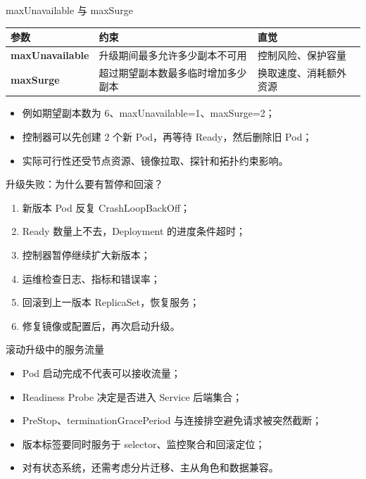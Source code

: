 \documentclass[UTF8,fontset=none,aspectratio=169,10pt]{beamer}
\begin{document}
\begin{frame}{maxUnavailable 与 maxSurge}
\begin{tabularx}{\linewidth}{>{\bfseries}p{3.1cm}XX}
\toprule
参数 & 约束 & 直觉 \\
\midrule
maxUnavailable & 升级期间最多允许多少副本不可用 & 控制风险、保护容量 \\
maxSurge & 超过期望副本数最多临时增加多少副本 & 换取速度、消耗额外资源 \\
\bottomrule
\end{tabularx}
\vfill
\begin{itemize}
  \item 例如期望副本数为 6、maxUnavailable=1、maxSurge=2；
  \item 控制器可以先创建 2 个新 Pod，再等待 Ready，然后删除旧 Pod；
  \item 实际可行性还受节点资源、镜像拉取、探针和拓扑约束影响。
\end{itemize}
\end{frame}

\begin{frame}{升级失败：为什么要有暂停和回滚？}
\begin{enumerate}
  \item 新版本 Pod 反复 CrashLoopBackOff；
  \item Ready 数量上不去，Deployment 的进度条件超时；
  \item 控制器暂停继续扩大新版本；
  \item 运维检查日志、指标和错误率；
  \item 回滚到上一版本 ReplicaSet，恢复服务；
  \item 修复镜像或配置后，再次启动升级。
\end{enumerate}
\vfill
{}
\end{frame}

\begin{frame}{滚动升级中的服务流量}
\begin{itemize}
  \item Pod 启动完成不代表可以接收流量；
  \item Readiness Probe 决定是否进入 Service 后端集合；
  \item PreStop、terminationGracePeriod 与连接排空避免请求被突然截断；
  \item 版本标签要同时服务于 selector、监控聚合和回滚定位；
  \item 对有状态系统，还需考虑分片迁移、主从角色和数据兼容。
\end{itemize}
\end{frame}
\end{document}
